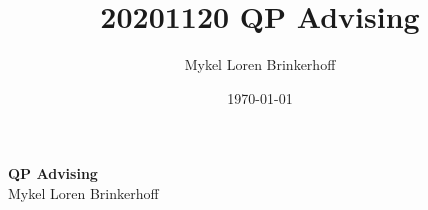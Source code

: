 \documentclass[12pt, letterpaper]{article}
\title{20201120 QP Advising}
\author{Mykel Loren Brinkerhoff}
\date{\today}
\begin{document}
	
	
	
\begin{center}
	{\Large \textbf{QP Advising}}\\
	\vspace{6pt}
	Mykel Loren Brinkerhoff\\
\end{center}
\thispagestyle{fancy}

\tableofcontents


\end{document}
